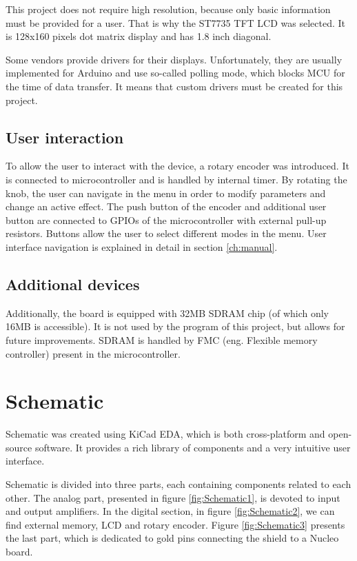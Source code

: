 \documentclass[a4paper,twoside,12pt]{book}
\begin{document}
This project does not require high resolution,
because only basic information must be provided for a user.
That is why the ST7735 TFT LCD was selected.
It is 128x160 pixels dot matrix display
and has 1.8 inch diagonal.

Some vendors provide drivers for their displays.
Unfortunately, they are usually implemented for Arduino
and use so-called polling mode,
which blocks MCU for the time of data transfer.
It means that custom drivers must be created for this project.

\subsection{User interaction}
To allow the user to interact with the device, a rotary encoder was introduced.
It is connected to microcontroller and is handled by internal timer.
By rotating the knob, the user can navigate in the menu
in order to modify parameters and change an active effect.
The push button of the encoder and additional user button are connected
to GPIOs of the microcontroller with external pull-up resistors.
Buttons allow the user to select different modes in the menu.
User interface navigation is explained in detail
in section \ref{ch:manual}.

\subsection{Additional devices}
Additionally, the board is equipped with 32MB SDRAM chip
(of which only 16MB is accessible).
It is not used by the program of this project, but allows for future improvements.
SDRAM is handled by FMC (eng. Flexible memory controller) present in the microcontroller.

\section{Schematic}
Schematic was created using KiCad EDA,
which is both cross-platform and open-source software.
It provides a rich library of components and a very intuitive user interface.

Schematic is divided into three parts,
each containing components related to each other.
The analog part, presented in figure \ref{fig:Schematic1}, is devoted to input and output amplifiers.
In the digital section, in figure \ref{fig:Schematic2}, we can find external memory, LCD and rotary encoder.
Figure \ref{fig:Schematic3} presents the last part,
which is dedicated to gold pins connecting the shield to a Nucleo board.
\end{document}
